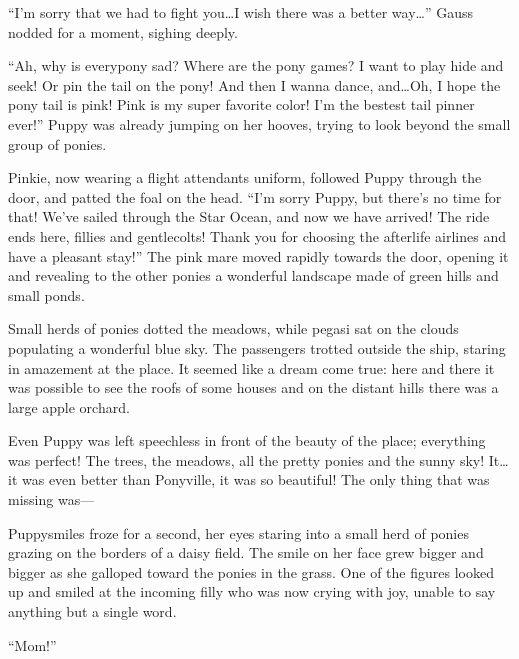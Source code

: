 ``I'm sorry that we had to fight you\dots I wish there was a better way\dots'' Gauss nodded for a moment, sighing deeply.

``Ah, why is everypony sad? Where are the pony games? I want to play hide and seek! Or pin the tail on the pony! And then I wanna dance, and\dots Oh, I hope the pony tail is pink! Pink is my super favorite color! I'm the bestest tail pinner ever!'' Puppy was already jumping on her hooves, trying to look beyond the small group of ponies.

Pinkie, now wearing a flight attendants uniform, followed Puppy through the door, and patted the foal on the head. ``I'm sorry Puppy, but there's no time for that! We've sailed through the Star Ocean, and now we have arrived! The ride ends here, fillies and gentlecolts! Thank you for choosing the afterlife airlines and have a pleasant stay!'' The pink mare moved rapidly towards the door, opening it and revealing to the other ponies a wonderful landscape made of green hills and small ponds.

Small herds of ponies dotted the meadows, while pegasi sat on the clouds populating a wonderful blue sky. The passengers trotted outside the ship, staring in amazement at the place. It seemed like a dream come true: here and there it was possible to see the roofs of some houses and on the distant hills there was a large apple orchard.

Even Puppy was left speechless in front of the beauty of the place; everything was perfect! The trees, the meadows, all the pretty ponies and the sunny sky! It\dots it was even better than Ponyville, it was so beautiful! The only thing that was missing was---

Puppysmiles froze for a second, her eyes staring into a small herd of ponies grazing on the borders of a daisy field. The smile on her face grew bigger and bigger as she galloped toward the ponies in the grass. One of the figures looked up and smiled at the incoming filly who was now crying with joy, unable to say anything but a single word.

``Mom!''


